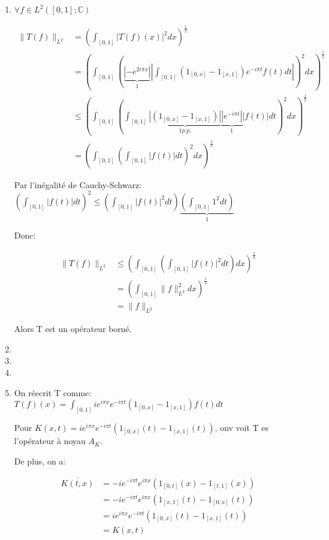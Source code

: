 \documentclass[10pt,a4paper,oneside]{article}
\newenvironment{solution}[1][Solution]{\begin{trivlist}
\item[\hskip \labelsep {\bfseries #1}]}{\end{trivlist}}
\begin{document}
\begin{solution}
\begin{enumerate}
\item
$\forall f \in L^2([0,1];\mathbb{C})$

\begin{align}
\|T(f)\|_{L^2} &= (\int_{[0,1]} |T(f)(x)|^2 dx)^{\frac{1}{2}} \nonumber \\
&= (\int_{[0,1]} ( \underbrace{|-e^{2i \pi x}|}_{1} |\int_{[0,1]} (1_{[0,x]} - 1_{[x,1]}) e^{-i \pi t} f(t) dt| )^2 dx)^{\frac{1}{2}} \nonumber \\
&\leq (\int_{[0,1]} ( \int_{[0,1]} \underbrace{|(1_{[0,x]} - 1_{[x,1]})|}_{1 p.p.} \underbrace{|e^{-i \pi t}|}_{1} |f(t)| dt )^2 dx)^{\frac{1}{2}} \nonumber \\
&= (\int_{[0,1]} ( \int_{[0,1]} |f(t)|dt )^2 dx)^{\frac{1}{2}} \nonumber
\end{align}

Par l'inégalité de Cauchy-Schwarz: $(\int_{[0,1]} |f(t)|dt)^2 \leq (\int_{[0,1]} |f(t)|^2 dt) \underbrace{(\int_{[0,1]} 1^2 dt)}_{1}$

Donc:

\begin{align}
\|T(f)\|_{L^2} &\leq (\int_{[0,1]} ( \int_{[0,1]} |f(t)|^2dt ) dx)^{\frac{1}{2}} \nonumber \\
&= (\int_{[0,1]} \| f \|^2_{L^2} dx)^{\frac{1}{2}} \nonumber \\
&= \| f \|_{L^2} \nonumber
\end{align}

Alors T est un opérateur borné.

\item

\item

\item

\item
On réecrit T comme: $T(f)(x) = \int_{[0,1]} ie^{i \pi x} e^{-i \pi t} (1_{[0,x]} - 1_{[x,1]}) f(t)dt$

Pour $K(x,t) = ie^{i \pi x} e^{-i \pi t} (1_{[0,x]}(t) - 1_{[x,1]}(t))$, onv voit T es l'opérateur à noyau $A_K$.

De plus, on a:

\begin{align}
\overline{K(t,x)} &= -ie^{-i \pi t} e^{i \pi x} (1_{[0,t]}(x) - 1_{[t,1]}(x)) \nonumber \\
&= -ie^{-i \pi t} e^{i \pi x} (1_{[x,1]}(t) - 1_{[0,x]}(t)) \nonumber \\
&= ie^{i \pi x} e^{-i \pi t} (1_{[0,x]}(t) - 1_{[x,1]}(t)) \nonumber \\
&= K(x,t) \nonumber
\end{align}


\end{enumerate}
\end{solution}
\end{document}
